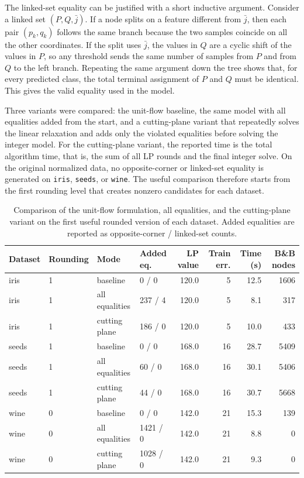\documentclass[11pt,a4paper]{article}
\begin{document}
The linked-set equality can be justified with a short inductive argument. Consider a linked set $(P,Q,\bar{j})$. If a node splits on a feature different from $\bar{j}$, then each pair $(p_k,q_k)$ follows the same branch because the two samples coincide on all the other coordinates. If the split uses $\bar{j}$, the values in $Q$ are a cyclic shift of the values in $P$, so any threshold sends the same number of samples from $P$ and from $Q$ to the left branch. Repeating the same argument down the tree shows that, for every predicted class, the total terminal assignment of $P$ and $Q$ must be identical. This gives the valid equality used in the model.

Three variants were compared: the unit-flow baseline, the same model with all equalities added from the start, and a cutting-plane variant that repeatedly solves the linear relaxation and adds only the violated equalities before solving the integer model. For the cutting-plane variant, the reported time is the total algorithm time, that is, the sum of all LP rounds and the final integer solve. On the original normalized data, no opposite-corner or linked-set equality is generated on \texttt{iris}, \texttt{seeds}, or \texttt{wine}. The useful comparison therefore starts from the first rounding level that creates nonzero candidates for each dataset.

\begin{table}[H]
\centering
\footnotesize
\begin{tabularx}{\textwidth}{llYYrrrr}
\toprule
Dataset & Rounding & Mode & Added eq. & LP value & Train err. & Time (s) & B\&B nodes \\
\midrule
iris & 1 & baseline & 0 / 0 & 120.0 & 5 & 12.5 & 1606 \\
iris & 1 & all equalities & 237 / 4 & 120.0 & 5 & 8.1 & 317 \\
iris & 1 & cutting plane & 186 / 0 & 120.0 & 5 & 10.0 & 433 \\
\midrule
seeds & 1 & baseline & 0 / 0 & 168.0 & 16 & 28.7 & 5409 \\
seeds & 1 & all equalities & 60 / 0 & 168.0 & 16 & 30.1 & 5406 \\
seeds & 1 & cutting plane & 44 / 0 & 168.0 & 16 & 30.7 & 5668 \\
\midrule
wine & 0 & baseline & 0 / 0 & 142.0 & 21 & 15.3 & 139 \\
wine & 0 & all equalities & 1421 / 0 & 142.0 & 21 & 8.8 & 0 \\
wine & 0 & cutting plane & 1028 / 0 & 142.0 & 21 & 9.3 & 0 \\
\bottomrule
\end{tabularx}
\caption{Comparison of the unit-flow formulation, all equalities, and the cutting-plane variant on the first useful rounded version of each dataset. Added equalities are reported as opposite-corner / linked-set counts.}
\label{tab:q4-methods}
\end{table}
\end{document}
